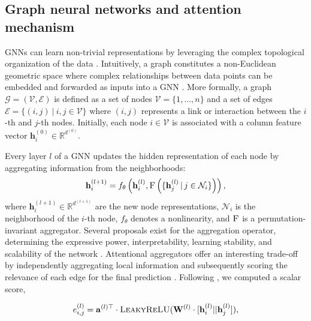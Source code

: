 \documentclass[a4paper,fleqn]{cas-sc}
\begin{document}

\subsection{Graph neural networks and attention mechanism}
GNNs can learn non-trivial representations by leveraging the complex topological organization of the data \cite{velivckovic2023everything,wu2019graphsurvey}. Intuitively, a graph constitutes a non-Euclidean geometric space where complex relationships between data points can be embedded and forwarded as inputs into a GNN \cite{BronsteinGeometricDL}. More formally, a graph $\mathcal{G} = (\mathcal{V}, \mathcal{E})$ is defined as a set of nodes $\mathcal{V} = \{1, \ldots, n\}$ and a set of edges $\mathcal{E} = \{(i,j) \ | \  i,j \in \mathcal{V}\}$ where $(i,j)$ represents a link or interaction between the $i$-th and $j$-th nodes. Initially, each node $i \in \mathcal{V}$ is associated with a column feature vector $\mathbf{h}_{i}^{(0)} \in \mathbb{R}^{d^{(0)}}$.

Every layer $l$ of a GNN updates the hidden representation of each node by aggregating information from the neighborhoods: 
\begin{equation} \label{layer}
    \mathbf{h}_{i}^{(l+1)} = f_{\theta} \left( \mathbf{h}_i^{(l)}, \textsc{F} \left( \{ \mathbf{h}^{(l)}_j \, | \, j \in \mathcal{N}_i \} \right) \right),
\end{equation}
where $\textbf{h}_{i}^{(l+1)} \in \mathbb{R}^{d^{(l+1)}}$ are the new node representations, $\mathcal{N}_i$ is the neighborhood of the $i$-th node, $f_{\theta}$ denotes a nonlinearity, and $\textsc{F}$ is a permutation-invariant aggregator. Several proposals exist for the aggregation operator, determining the expressive power, interpretability, learning stability, and scalability of the network \cite{velivckovic2023everything}. Attentional aggregators offer an interesting trade-off by independently aggregating local information and subsequently scoring the relevance of each edge for the final prediction \cite{velickovic2018graph}. Following \cite{brody2021gatv2}, we computed a scalar score,

\begin{equation} \label{score_e}
    e_{i,j}^{(l)} = \mathbf{a}^{(l)\top}  \cdot \textsc{LeakyReLU}(\mathbf{W}^{(l)} \cdot [\mathbf{h}_{i}^{(l)} || \mathbf{h}_{j}^{(l)}]),
\end{equation} 
\end{document}
